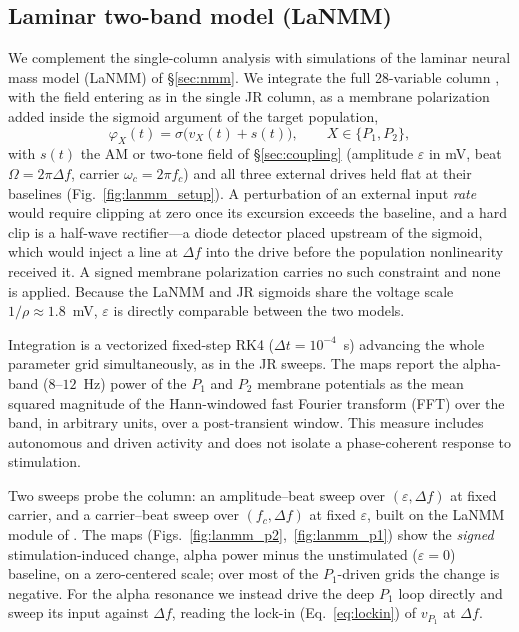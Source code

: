 \documentclass[11pt,a4paper]{article}
\newcommand{\Sig}{\sigma}
\begin{document}
\subsection{Laminar two-band model (LaNMM)}
We complement the single-column analysis with simulations of the laminar neural
mass model (LaNMM) of \S\ref{sec:nmm}. We integrate the full 28-variable column
\cite{ruffini2025cfc,sanchezTodo2023}, with the field entering as in the single
JR column, as a membrane polarization added inside the sigmoid argument of the target
population,
\begin{equation}
\varphi_X(t)=\Sig\!\big(v_X(t)+s(t)\big),\qquad X\in\{P_1,P_2\},
\label{eq:lanmm_drive}
\end{equation}
with $s(t)$ the AM or two-tone field of \S\ref{sec:coupling} (amplitude $\varepsilon$ in
mV, beat $\Omega=2\pi\Delta f$, carrier $\omega_c=2\pi f_c$) and all three external drives
held flat at their baselines (Fig.~\ref{fig:lanmm_setup}). A perturbation of an external
input \emph{rate} would require clipping at zero
once its excursion exceeds the baseline, and a hard clip is a half-wave rectifier---a
diode detector placed upstream of the sigmoid, which would inject a line at $\Delta f$
into the drive before the population nonlinearity received it. A signed membrane
polarization carries no such constraint and none is applied. Because the LaNMM and JR
sigmoids share the voltage scale $1/\rho\approx1.8$~mV, $\varepsilon$ is directly
comparable between the two models.

Integration is a vectorized fixed-step RK4
($\Delta t=10^{-4}$~s) advancing the whole parameter grid simultaneously, as in the JR
sweeps. The maps report the
alpha-band ($8$--$12$~Hz) power of the $P_1$ and $P_2$ membrane potentials as the mean
squared magnitude of the Hann-windowed fast Fourier transform (FFT) over the band, in arbitrary units, over a
post-transient window. This measure includes autonomous and driven activity and
does not isolate a phase-coherent response to stimulation.

Two sweeps probe the column: an amplitude--beat sweep over
$(\varepsilon,\Delta f)$ at fixed carrier, and a carrier--beat sweep
over $(f_c,\Delta f)$ at fixed $\varepsilon$, built on the LaNMM module of
\cite{ruffini2025cfc}. The maps
(Figs.~\ref{fig:lanmm_p2},~\ref{fig:lanmm_p1}) show the \emph{signed} stimulation-induced
change, alpha power minus the unstimulated ($\varepsilon=0$) baseline, on a zero-centered
scale; over most of the $P_1$-driven grids the change is negative. For the
alpha resonance we instead drive the deep $P_1$ loop directly and sweep its input against
$\Delta f$, reading the lock-in (Eq.~\eqref{eq:lockin}) of $v_{P_1}$ at $\Delta f$.
\end{document}
